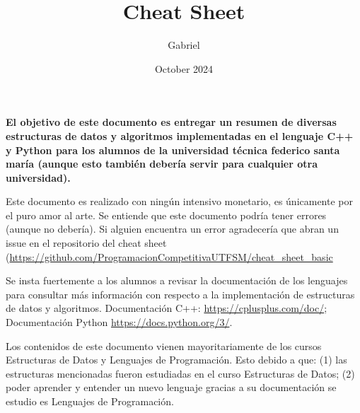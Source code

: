 \documentclass{article}
\title{\footnotesize Cheat Sheet}
\author{\footnotesize Gabriel }
\date{\footnotesize October 2024}
\begin{document}
\scriptsize
\maketitle

{
  \bf El objetivo de este documento es entregar un resumen de diversas estructuras de datos y algoritmos implementadas en el lenguaje C++ y Python para los alumnos de la universidad técnica federico santa maría (aunque esto también debería servir para cualquier otra universidad).

  Este documento es realizado con ningún intensivo monetario, es únicamente por el puro amor al arte. Se entiende que este documento podría tener errores (aunque no debería). Si alguien encuentra un error agradecería que abran un issue en el repositorio del cheat sheet (\href{https://github.com/ProgramacionCompetitivaUTFSM/cheat_sheet_basic}{https://github.com/ProgramacionCompetitivaUTFSM/cheat\_sheet\_basic}

  Se insta fuertemente a los alumnos a revisar la documentación de los lenguajes para consultar más información con respecto a la implementación de estructuras de datos y algoritmos. Documentación C++: \href{https://cplusplus.com/doc/}{https://cplusplus.com/doc/}; Documentación Python \href{https://docs.python.org/3/}{https://docs.python.org/3/}.

  Los contenidos de este documento vienen mayoritariamente de los cursos Estructuras de Datos y Lenguajes de Programación. Esto debido a que: (1) las estructuras mencionadas fueron estudiadas en el curso Estructuras de Datos; (2) poder aprender y entender un nuevo lenguaje gracias a su documentación se estudio es Lenguajes de Programación.
}
\end{document}

